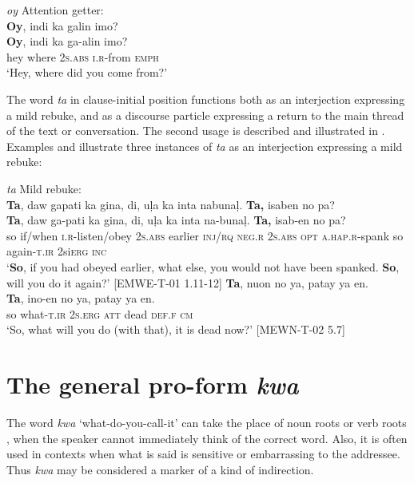\newpage

\ea
\label{bkm:Ref118731240}
\textit{oy} Attention getter: \\
\textbf{Oy},  indi  ka  galin  imo? \\\smallskip
\gll \textbf{Oy},  indi  ka  ga-alin  imo? \\
hey  where  2\textsc{s.abs}  \textsc{i.r}-from  \textsc{emph} \\
\glt ‘Hey, where did you come from?’
\z

The word \textit{ta} in clause-initial position functions both as an interjection expressing a mild rebuke, and as a discourse particle expressing a return to the main thread of the text or conversation. The second usage is described and illustrated in . Examples  and  illustrate three instances of \textit{ta} as an interjection expressing a mild rebuke:

\ea 
\label{bkm:Ref118798805}\label{bkm:Ref329594868}
\textit{ta} Mild rebuke: \\
\textbf{Ta},  daw  gapati  ka  gina,  di,  uļa  ka  inta nabunaļ.  \textbf{Ta,}  isaben  no  pa? \\\smallskip
\gll \textbf{Ta},  daw  ga-pati  ka  gina,  di,  uļa  ka  inta na-bunaļ.  \textbf{Ta,}  isab-en  no  pa? \\
so  if/when  \textsc{i.r}-listen/obey  2\textsc{s.abs}  earlier  \textsc{inj/rq}  \textsc{neg.r}  2\textsc{s.ab}\textsc{s}  \textsc{opt}
\textsc{a.hap.r}-spank  so  again-\textsc{t.ir}  2si\textsc{erg}  \textsc{inc} \\
\glt `\textbf{So}, if you had obeyed earlier, what else, you would not have been spanked. \textbf{So}, will you do it again?' [EMWE-T-01 1.11-12]
\z
\ea 
\label{bkm:Ref118798909}
\textbf{Ta},  nuon  no  ya,  patay  ya  en. \\\smallskip
\gll \textbf{Ta},  ino-en  no  ya,  patay  ya  en. \\
so  what-\textsc{t.ir}  2\textsc{s.erg}  \textsc{att}  dead  \textsc{def.f}  \textsc{cm} \\
\glt ‘So, what will you do (with that), it is dead now?’ [MEWN-T-02 5.7]
\z

\section{The general pro-form \textit{kwa}}
\label{bkm:Ref113971891}
The word \textit{kwa} ‘what-do-you-call-it’ can take the place of noun roots  or verb roots , when the speaker cannot immediately think of the correct word. Also, it is often used in contexts when what is said is sensitive or embarrassing to the addressee. Thus \textit{kwa} may be considered a marker of a kind of indirection.

